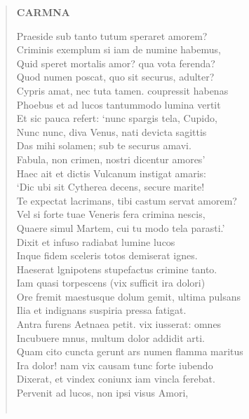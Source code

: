 \documentclass[11pt, a4paper]{report}
\begin{document}
\begin{verse}
    \begin{center} \textbf{CARMNA} \end{center} \marginpar{[208]} Praeside sub tanto tutum speraret amorem? \\ Criminis exemplum si iam de numine habemus, \\ Quid speret mortalis amor? qua vota ferenda? \\ Quod numen poscat, quo sit securus, adulter? \\ Cypris amat, nec tuta tamen. coupressit habenas \\ Phoebus et ad lucos tantummodo lumina vertit \\ Et sic pauca refert: ‘nunc spargis tela, Cupido, \\ Nunc nunc, diva Venus, nati devicta sagittis \\ Das mihi solamen; sub te securus amavi. \\ Fabula, non crimen, nostri dicentur amores’ \\ Haec ait et dictis Vulcanum instigat amaris: \\ ‘Dic ubi sit Cytherea decens, secure marite! \\ Te expectat lacrimans, tibi castum servat amorem? \\ Vel si forte tuae Veneris fera crimina nescis, \\ Quaere simul Martem, cui tu modo tela parasti.’ \\ Dixit et infuso radiabat lumine lucos \\ Inque fidem sceleris totos demiserat ignes. \\ Haeserat lgnipotens stupefactus crimine tanto. \\ Iam quasi torpescens (vix sufficit ira dolori) \\ Ore fremit maestusque dolum gemit, ultima pulsans \\ Ilia et indignans suspiria pressa fatigat. \\ Antra furens Aetnaea petit. vix iusserat: omnes \\ Incubuere mnus, multum dolor addidit arti. \\ Quam cito cuncta gerunt ars numen flamma maritus \\ Ira dolor! nam vix causam tunc forte iubendo \\ Dixerat, et vindex coniunx iam vincla ferebat. \\ Pervenit ad lucos, non ipsi visus Amori, \\ 
        ﻿\pagebreak 

\end{verse}
\end{document}
